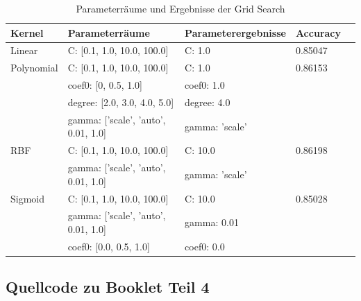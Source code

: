 \begin{table}[H]
	\begin{tabular}{lllll}
		\hline
		Kernel& Parameterräume & Parameterergebnisse & Accuracy \\ \hline
		Linear &  C: [0.1, 1.0, 10.0, 100.0]  &  C: 1.0      &  0.85047   \\ \hline
		Polynomial  &  C: [0.1, 1.0, 10.0, 100.0] & C: 1.0     &  0.86153   \\
		&  coef0: [0, 0.5, 1.0] & coef0: 1.0    &     \\
		&  degree: [2.0, 3.0, 4.0, 5.0] &degree:  4.0   &      \\
		&  gamma: ['scale', 'auto', 0.01, 1.0] & gamma: 'scale'    &      \\\hline
		RBF &  C: [0.1, 1.0, 10.0, 100.0]  &   C: 10.0    &   0.86198   \\
		&  gamma: ['scale', 'auto', 0.01, 1.0] &   gamma: 'scale'   &    \\ \hline
		Sigmoid&  C: [0.1, 1.0, 10.0, 100.0] &   C: 10.0   &  0.85028  \\
		&  gamma: ['scale', 'auto', 0.01, 1.0] &  gamma: 0.01   &   \\
		&  coef0: [0.0, 0.5, 1.0] &  coef0: 0.0   &   \\ \hline
	\end{tabular}
	\caption{ Parameterräume und Ergebnisse der Grid Search}
	\label{tab:svm_results_gridSearch}
\end{table}

\subsection{Quellcode zu Booklet Teil 4}